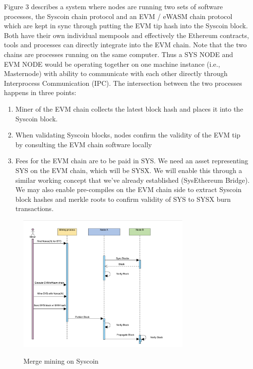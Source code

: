\documentclass[peerreview]{ieeesyscoin}
\begin{document}
Figure 3 describes a system where nodes are running two sets of software processes, the Syscoin chain protocol and an EVM / eWASM chain protocol which are kept in sync through putting the EVM tip hash into the Syscoin block. Both have their own individual mempools and effectively the Ethereum contracts, tools and processes can directly integrate into the EVM chain. Note that the two chains are processes running on the same computer. Thus a SYS NODE and EVM NODE would be operating together on one machine instance (i.e., Masternode) with ability to communicate with each other directly through Interprocess Communication (IPC). The intersection between the two processes happens in three points:

\begin{enumerate}
\item Miner of the EVM chain collects the latest block hash and places it into the Syscoin block.
\item When validating Syscoin blocks, nodes confirm the validity of the EVM tip by consulting the EVM chain software locally
\item Fees for the EVM chain are to be paid in SYS. We need an asset representing SYS on the EVM chain, which will be SYSX. We will enable this through a similar working concept that we’ve already established (SysEthereum Bridge). We may also enable pre-compiles on the EVM chain side to extract Syscoin block hashes and merkle roots to confirm validity of SYS to SYSX burn transactions.
\end{enumerate}

\begin{figure}[h!]
\includegraphics[width=3.4in]{img/fig_6.png}
\label{fig:tech_stack}
\caption{Merge mining on Syscoin} 
\end{figure} 
\end{document}
